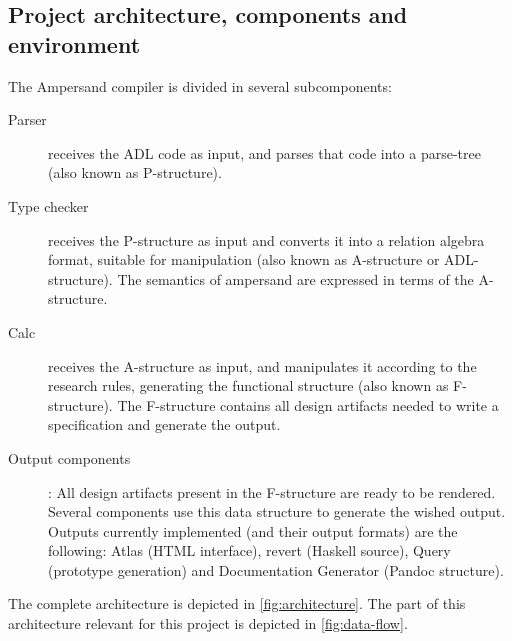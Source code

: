 \subsection{Project architecture, components and environment}
\label{subsec:architecture}
The Ampersand compiler is divided in several subcomponents:
%
%
%
%
\begin{description}
	\item[Parser] receives the ADL code as input, and parses that code into a parse-tree (also known as P-structure).
	\item[Type checker] receives the P-structure as input and converts it into a relation algebra format, suitable for manipulation (also known as A-structure or ADL-structure).
		 The semantics of ampersand are expressed in terms of the A-structure.
	\item[Calc] receives the A-structure as input, and manipulates it according to the research rules, generating the functional structure (also known as F-structure).
		The F-structure contains all design artifacts needed to write a specification and generate the output.
	\item[Output components]: All design artifacts present in the F-structure are ready to be rendered.
		Several components use this data structure to generate the wished output.
		Outputs currently implemented (and their output formats) are the following: Atlas (HTML interface), revert (Haskell source), Query (prototype generation) and Documentation Generator (Pandoc structure).
\end{description}
%
The complete architecture is depicted in \autoref{fig:architecture}.
The part of this architecture relevant for this project is depicted in \autoref{fig:data-flow}.
%

